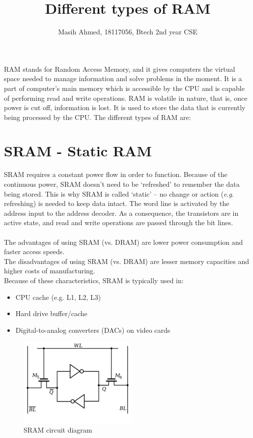 \documentclass[a4paper,12pt]{article}
\begin{document}
\graphicspath{{images/}}
\newcommand{\ie}{\textit{i}.\textit{e}., }
\newcommand{\eg}{\textit{e}.\textit{g}. }

\title{Different types of RAM}
\date{}
\author{Masih Ahmed, 18117056, Btech 2nd year CSE}
\maketitle
RAM stands for Random Access Memory, and it gives computers the virtual space needed to manage information and solve problems in the moment. It is a part of computer's main memory which is accessible by the CPU and is capable of performing read and write operations. RAM is volatile in nature, that is, once power is cut off, information is lost. It is used to store the data that is currently being processed by the CPU.
The different types of RAM are: 

\section{SRAM - Static RAM}
SRAM requires a constant power flow in order to function. Because of the continuous power, SRAM doesn’t need to be ‘refreshed’ to remember the data being stored. This is why SRAM is called ‘static’ – no change or action (\eg refreshing) is needed to keep data intact. The word line is activated by the address input to the address decoder. As a consequence, the transistors are in active state, and read and write operations are passed through the bit lines. 
\\
\\The advantages of using SRAM (vs. DRAM) are lower power consumption and faster access speeds. 
\\The disadvantages of using SRAM (vs. DRAM) are lesser memory capacities and higher costs of manufacturing. 
\\Because of these characteristics, SRAM is typically used in:

	\begin{itemize}
		\item CPU cache (e.g. L1, L2, L3)
		\item Hard drive buffer/cache	
		\item Digital-to-analog converters (DACs) on video cards
	\end{itemize}

	\begin{figure}[H]
	\begin{center}
		\includegraphics{SRAM.png}
		\caption{SRAM circuit diagram}
	\end{center}
	\end{figure}
\end{document}
